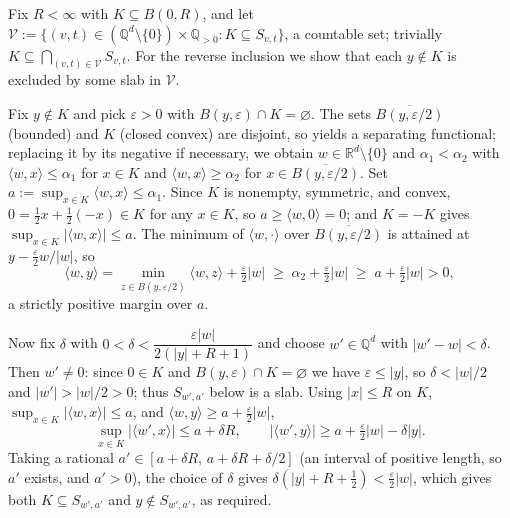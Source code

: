 \documentclass[12pt,a4paper]{article}
\makeatletter
\theoremstyle{definition}
\renewenvironment{proof}[1][\proofname]{\par
  \pushQED{\qed}%
  \normalfont \topsep6\p@\@plus6\p@\relax
  \trivlist
  \item[\hskip\labelsep\bfseries #1\@addpunct{.}]\ignorespaces
}{%
  \popQED\endtrivlist\@endpefalse
}
\newcommand{\R}{\mathbb{R}}
\makeatother
\begin{document}
\begin{proof}
  Fix $R<\infty$ with $K\subseteq B(0,R)$, and let
  $\mathcal V:=\{(v,t)\in(\mathbb{Q}^d\setminus\{0\})\times\mathbb{Q}_{>0}:K\subseteq S_{v,t}\}$,
  a countable set; trivially $K\subseteq\bigcap_{(v,t)\in\mathcal V}S_{v,t}$.
  For the reverse inclusion we show that each $y\notin K$ is excluded by
  some slab in $\mathcal V$.

  Fix $y\notin K$ and pick $\varepsilon>0$ with
  $B(y,\varepsilon)\cap K=\varnothing$.  The sets
  $\overline{B(y,\varepsilon/2)}$ (bounded) and $K$ (closed convex) are
  disjoint, so  yields a separating functional;
  replacing it by its negative if necessary, we obtain
  $w\in\R^d\setminus\{0\}$ and $\alpha_1<\alpha_2$ with
  $\langle w,x\rangle\leqslant\alpha_1$ for $x\in K$ and
  $\langle w,x\rangle\geqslant\alpha_2$ for $x\in\overline{B(y,\varepsilon/2)}$.
  Set $a:=\sup_{x\in K}\langle w,x\rangle\leqslant\alpha_1$.  Since $K$ is
  nonempty, symmetric, and convex, $0=\tfrac12 x+\tfrac12(-x)\in K$ for
  any $x\in K$, so $a\geqslant\langle w,0\rangle=0$; and $K=-K$ gives
  $\sup_{x\in K}|\langle w,x\rangle|\leqslant a$.  The minimum of
  $\langle w,\cdot\rangle$ over $\overline{B(y,\varepsilon/2)}$ is attained at
  $y-\tfrac{\varepsilon}{2}w/|w|$, so
  \[
    \langle w,y\rangle
    =\min_{z\in\overline{B(y,\varepsilon/2)}}\langle w,z\rangle
      +\tfrac{\varepsilon}{2}|w|
    \;\geqslant\;\alpha_2+\tfrac{\varepsilon}{2}|w|
    \;\geqslant\;a+\tfrac{\varepsilon}{2}|w|>0,
  \]
  a strictly positive margin over $a$.

  Now fix $\delta$ with $0<\delta<\dfrac{\varepsilon|w|}{2(|y|+R+1)}$ and
  choose $w'\in\mathbb{Q}^d$ with
  $|w'-w|<\delta$.  Then $w'\neq0$: since $0\in K$ and
  $B(y,\varepsilon)\cap K=\varnothing$ we have $\varepsilon\leqslant|y|$, so
  $\delta<|w|/2$ and $|w'|>|w|/2>0$; thus $S_{w',a'}$ below is a slab.  Using $|x|\leqslant R$ on $K$,
  $\sup_{x\in K}|\langle w,x\rangle|\leqslant a$, and
  $\langle w,y\rangle\geqslant a+\tfrac{\varepsilon}{2}|w|$,
  \[
    \sup_{x\in K}|\langle w',x\rangle|
    \leqslant a+\delta R,\qquad
    |\langle w',y\rangle|\geqslant a+\tfrac{\varepsilon}{2}|w|-\delta|y|.
  \]
  Taking
  a rational $a'\in[a+\delta R,\,a+\delta R+\delta/2]$ (an interval of
  positive length, so $a'$ exists, and $a'>0$), the choice of $\delta$ gives $\delta(|y|+R+\tfrac12)
  <\tfrac{\varepsilon}{2}|w|$, which gives both $K\subseteq S_{w',a'}$ and
  $y\notin S_{w',a'}$, as required.
\end{proof}
\end{document}
